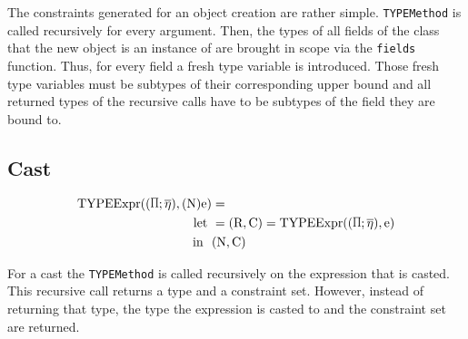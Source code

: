 The constraints generated for an object creation are rather simple. \verb|TYPEMethod| is called recursively for every argument. Then, the types of all
fields of the class that the new object is an instance of are brought in scope via the \verb|fields| function. Thus, for every field a fresh type variable is introduced.
Those fresh type variables must be subtypes of their corresponding upper bound and all returned types of the recursive calls have to be subtypes of the field they are bound to.

\subsection{Cast}

\begin{align*}
    \texpr{(\text{N})\text{e}} &=\\
    \text{let} \ &= (\text{R}, \text{C}) = \texpr{\text{e}}\\
    \text{in} \ \ &(\text{N}, \text{C})
\end{align*}

For a cast the \verb|TYPEMethod| is called recursively on the expression that is casted. This recursive call returns a type and a constraint set. However, instead of returning that type, the type the expression is casted to and the constraint set are returned.
